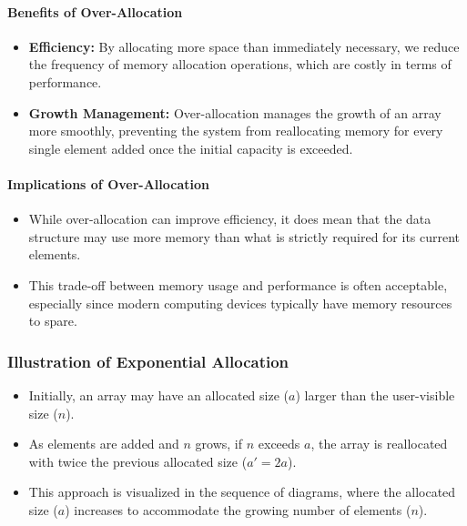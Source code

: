 \documentclass[12pt]{article}
\begin{document}
\paragraph{Benefits of Over-Allocation}
\begin{itemize}
\item \textbf{Efficiency:} By allocating more space than immediately necessary, we reduce the frequency of memory allocation operations, which are costly in terms of performance.
\item \textbf{Growth Management:} Over-allocation manages the growth of an array more smoothly, preventing the system from reallocating memory for every single element added once the initial capacity is exceeded.
\end{itemize}

\paragraph{Implications of Over-Allocation}
\begin{itemize}
\item While over-allocation can improve efficiency, it does mean that the data structure may use more memory than what is strictly required for its current elements.
\item This trade-off between memory usage and performance is often acceptable, especially since modern computing devices typically have memory resources to spare.
\end{itemize}



\subsubsection{Illustration of Exponential Allocation}
\begin{itemize}
    \item Initially, an array may have an allocated size (\( a \)) larger than the user-visible size (\( n \)).
    \item As elements are added and \( n \) grows, if \( n \) exceeds \( a \), the array is reallocated with twice the previous allocated size (\( a' = 2a \)).
    \item This approach is visualized in the sequence of diagrams, where the allocated size (\( a \)) increases to accommodate the growing number of elements (\( n \)).
\end{itemize}
\end{document}
